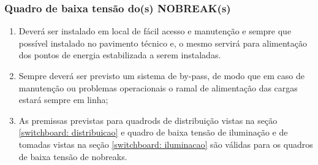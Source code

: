\subsubsection{Quadro de baixa tensão do(s) NOBREAK(s)}

\begin{enumerate}
	\item Deverá ser instalado em local de fácil acesso e manutenção e sempre que possível instalado no pavimento técnico e, o mesmo servirá para alimentação dos pontos de energia estabilizada a serem instaladas.
	\item Sempre deverá ser previsto um sistema de by-pass, de modo que em caso de manutenção ou problemas operacionais o ramal de alimentação das cargas estará sempre em linha;
	\item As premissas previstas para quadrods de distribuição vistas na seção \ref{switchboard: distribuicao} e quadro de baixa tensão de iluminação e de tomadas vistas na seção \ref{switchboard: iluminacao} são válidas para os quadros de baixa tensão de nobreaks.
\end{enumerate}